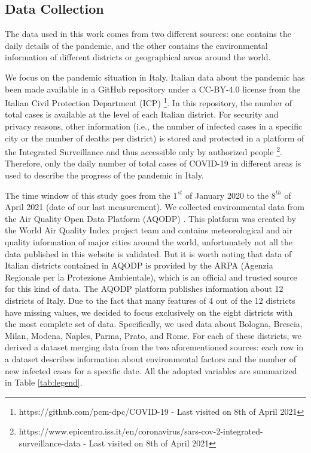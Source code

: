 \documentclass[review]{elsarticle}
\begin{document}
\subsection{Data Collection}
The data used in this work comes from two different sources: one contains the daily details of the pandemic, and the other contains the environmental information of different districts or geographical areas around the world.

We focus on the pandemic situation in Italy. Italian data about the pandemic has been made available in a GitHub repository under a CC-BY-4.0 license from the Italian Civil Protection Department (ICP) \footnote{https://github.com/pcm-dpc/COVID-19 - Last visited on 8th of April 2021}. In this repository, the number of total cases is available at the level of each Italian district. For security and privacy reasons, other information (i.e., the number of infected cases in a specific city or the number of deaths per district) is stored  and protected in a platform of the Integrated Surveillance and thus accessible only by authorized people \footnote{https://www.epicentro.iss.it/en/coronavirus/sars-cov-2-integrated-surveillance-data - Last visited on 8th of April 2021}. Therefore, only the daily number of total cases of COVID-19 in different areas is used to describe the progress of the pandemic in Italy. 

The time window of this study goes from the $1^{st}$ of January 2020 %
to the $8^{th}$ of April 2021 (date of our last measurement). 
We collected environmental data from the Air Quality Open Data Platform (AQODP) \cite{world2020air}. This platform was created by the World Air Quality Index project team and contains meteorological and air quality information of major cities around the world, unfortunately not all the data published in this website is validated. But it is worth noting that data of Italian districts contained in AQODP is provided by the ARPA (Agenzia Regionale per la Protezione Ambientale), which is an official and trusted source for this kind of data. 
The AQODP platform publishes information about 12 districts of Italy. Due to the fact that many features of 4 out of the 12 districts have missing values, we decided to focus exclusively on the eight districts with the most complete set of data. Specifically, we used data about Bologna, Brescia, Milan, Modena, Naples, Parma, Prato, and Rome. 
For each of these districts, we derived a dataset merging data from the two aforementioned sources: each row in a dataset describes information about environmental factors and the number of new infected cases for a specific date. All the adopted variables are summarized in Table \ref{tab:legend}.
\end{document}
